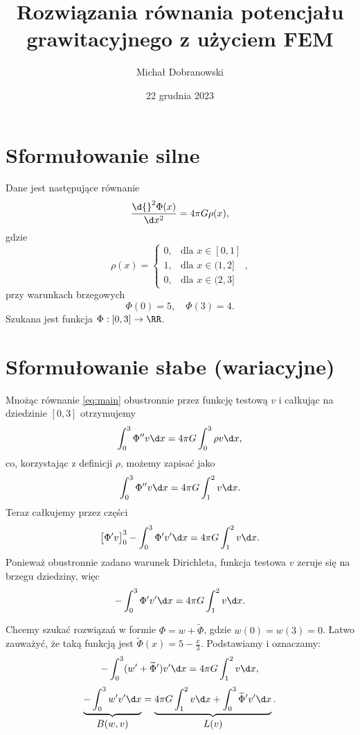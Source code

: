 \documentclass[12pt]{scrartcl}
\title{Rozwiązania równania potencjału grawitacyjnego z użyciem FEM}
\author{Michał Dobranowski}
\date{22 grudnia 2023}
\begin{document}
    \maketitle

    \section*{Sformułowanie silne}
    Dane jest następujące równanie
    \begin{equation} \label{eq:main}
        \frac{\d{}^2 \Phi(x)}{\d x^2} = 4\pi G\rho(x),
    \end{equation}
    gdzie
    \[ \rho(x) = \begin{cases}
        0, & \text{dla } x \in [0, 1] \\
        1, & \text{dla } x \in (1, 2] \\
        0, & \text{dla } x \in (2, 3]
    \end{cases}, \]
    przy warunkach brzegowych
    \[ \Phi(0) = 5, \quad \Phi(3) = 4. \]
    Szukana jest funkcja $\Phi : [0, 3] \to \RR$.

    \section*{Sformułowanie słabe (wariacyjne)}
    Mnożąc równanie \ref{eq:main} obustronnie przez funkcję testową $v$ i całkując na dziedzinie $[0, 3]$ otrzymujemy
    \[ \int_0^3 \Phi'' v \d x = 4\pi G \int_0^3 \rho v \d x, \]
    co, korzystając z definicji $\rho$, możemy zapisać jako
    \[ \int_0^3 \Phi'' v \d x = 4\pi G \int_1^2 v \d x. \]
    Teraz całkujemy przez części
    \[ \big[\Phi' v\big]_0^3 - \int_0^3 \Phi' v' \d x = 4\pi G \int_1^2 v \d x. \]
    Ponieważ obustronnie zadano warunek Dirichleta, funkcja testowa $v$ zeruje się na brzegu dziedziny, więc
    \[ -\int_0^3 \Phi' v' \d x = 4\pi G \int_1^2 v \d x. \]

    \newcommand{\tPhi}{\widetilde{\Phi}}
    Chcemy szukać rozwiązań w formie $\Phi = w + \tPhi$, gdzie $w(0) = w(3) = 0$. Łatwo zauważyć, że taką funkcją jest $\tPhi(x) = 5 - \frac{x}{3}$. Podstawiamy i oznaczamy:
    \[ -\int_0^3 (w' + \tPhi') v' \d x = 4\pi G \int_1^2 v \d x, \]
    \begin{equation}
        \underbrace{-\int_0^3 w'v' \d x}_{\let\scriptstyle\textstyle \substack{B(w, v)}} = \underbrace{4\pi G \int_1^2 v \d x + \int_0^3 \tPhi'v' \d x}_{\let\scriptstyle\textstyle \substack{L(v)}}.
    \end{equation}
\end{document}
